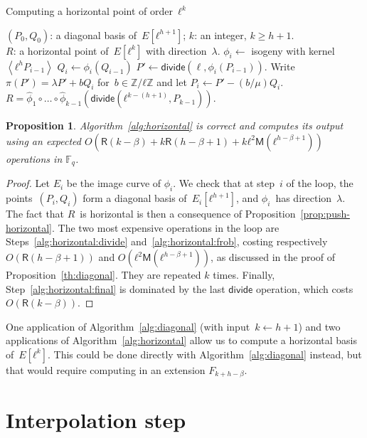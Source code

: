 \documentclass{lms}
\newtheorem{prop}[thm]{Proposition}
\def\chev#1{\left\langle#1\right\rangle}
\def\cout#1{\mathsf{#1}}
\def\sfdiv{\mathsf{divide}}
\newcommand{\F}{\mathbb{F}}
\newcommand{\MM}{\cout{M}}
\newcommand{\RR}{\cout{R}}
\begin{document}
\begin{algorithm}
\caption{\label{alg:horizontal}Computing a horizontal point of order~$ℓ^k$}
\begin{algorithmic}[1]
\REQUIRE $(P_0, Q_0)$: a diagonal basis of~$E[ℓ^{h+1}]$; $k$: an integer,
$k ≥ h + 1$.\\
\ENSURE $R$: a horizontal point of~$E[ℓ^k]$ with direction~$λ$.
\STATE $ϕ_i \gets $ isogeny with kernel~$\chev{ℓ^{h} P_{i-1}}$
\STATE $Q_{i} \gets ϕ_i(Q_{i-1})$
\STATE\label{alg:horizontal:divide} $P' \gets \sfdiv(\ell, ϕ_i(P_{i-1}))$.
\STATE\label{alg:horizontal:frob} Write~$π(P') = λ P' + b Q_i$ for~$b ∈ ℤ/ℓℤ$ and
let $P_{i} \gets P' - (b/μ) Q_i$.
\ENDFOR
\RETURN\label{alg:horizontal:final} $R = \widehat{ϕ}_1 ∘ … ∘ \widehat{ϕ}_{k-1}
  (\sfdiv( ℓ^{k-(h+1)}, P_{k-1}) )$. 
\end{algorithmic}
\end{algorithm}
\begin{prop}\label{th:horizontal}
  Algorithm~\ref{alg:horizontal} is correct and computes its output
  using an expected $O(\RR(k-\beta) + k\RR(h-β+1) + kℓ^2\MM(ℓ^{h-β+1}))$
  operations in $\F_q$.
\end{prop}
\begin{proof}
Let $E_i$ be the image curve of $ϕ_i$.
We check that at step~$i$ of the loop,
the points~$(P_i, Q_i)$ form a diagonal basis of~$E_i[ℓ^{h+1}]$,
and $ϕ_i$~has direction~$λ$.
The fact that $R$~is horizontal is then a consequence
of Proposition~\ref{prop:push-horizontal}.
The two most expensive operations in the loop are
Steps~\ref{alg:horizontal:divide} and~\ref{alg:horizontal:frob},
costing respectively $O(\RR(h-β+1))$ and $O(ℓ^2\MM(ℓ^{h-β+1}))$, as
discussed in the proof of Proposition~\ref{th:diagonal}. They are
repeated $k$ times. Finally, Step~\ref{alg:horizontal:final} is
dominated by the last $\sfdiv$ operation, which costs $O(\RR(k-β))$.
\end{proof}

One application of Algorithm~\ref{alg:diagonal} (with input~$k ← h+1$)
and two applications of Algorithm~\ref{alg:horizontal} allow us
to compute a horizontal basis of~$E[ℓ^k]$.
This could be done directly with Algorithm~\ref{alg:diagonal} instead,
but that would require computing in an extension $F_{k+h-\beta}$.



\section{Interpolation step}
\label{sec:interpolation}
\end{document}
